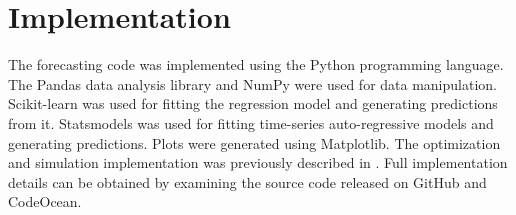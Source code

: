 \section{Implementation}
\label{sec:implementation}

The forecasting code was implemented using the Python programming language\cite{Python3}.
The Pandas\cite{Pandas} data analysis library and NumPy\cite{NumPy} were used for data manipulation.
Scikit-learn\cite{scikit-learn} was used for fitting the regression model and generating predictions from it.
Statsmodels\cite{statsmodels} was used for fitting time-series auto-regressive models and generating predictions.
Plots were generated using Matplotlib\cite{Matplotlib}.
The optimization and simulation implementation was previously described in \cite{Brown2022}.
Full implementation details can be obtained by examining the source code released on GitHub\cite{ELECO2023GithubRepo} and CodeOcean\cite{ELECO2023CodeOceanRepo}.